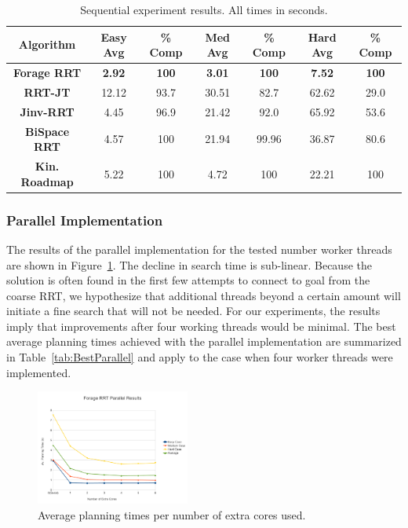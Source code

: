 \documentclass[conference]{IEEEtran}
\begin{document}
\begin{table}
  \caption{Sequential experiment results. All times in seconds. 
    \label{tab:Results}}
  \centering
  \begin{tabular}{| c | c | c | c | c | c | c | }
  \hline
  Algorithm & \textbf{Easy Avg} & \textbf{\% Comp} &\textbf{Med Avg} & 
             \textbf{\% Comp} & \textbf{Hard Avg} & \textbf{\% Comp} \\ \hline
  \textbf{Forage RRT}&
  \textbf{2.92}&\textbf{100}&\textbf{3.01}&\textbf{100}&\textbf{7.52}&
  \textbf{100}\\ \hline
  \textbf{RRT-JT}& 12.12&93.7&30.51&82.7&62.62&29.0\\ \hline
  \textbf{Jinv-RRT}&4.45&96.9&21.42&92.0&65.92&53.6\\ \hline
  \textbf{BiSpace RRT}&4.57&100&21.94&99.96&36.87&80.6\\ \hline
  \textbf{Kin. Roadmap}&5.22&100&4.72&100&22.21&100\\ \hline
\end{tabular}
\end{table}

\subsubsection{Parallel Implementation}
The results of the parallel implementation for the tested number
worker threads are shown in Figure~\ref{fig:ParallelResults}. 
The decline in search time is sub-linear.  Because the solution is often 
found in the first few attempts to connect to goal from the coarse RRT, we
hypothesize that additional threads beyond a certain amount will initiate a 
fine search that will not be needed.
For our experiments, the results imply that improvements after four working 
threads would be minimal. The best average planning times achieved with the 
parallel implementation are summarized in Table~\ref{tab:BestParallel} and 
apply to the case when four worker threads were implemented.

\begin{figure}[h!]
  \centering
    \includegraphics[width=0.45\textwidth]{figures/ParallelGraph.pdf}
  \caption{Average planning times per number of extra cores used. 
    \label{fig:ParallelResults} }
\end{figure}
\end{document}
